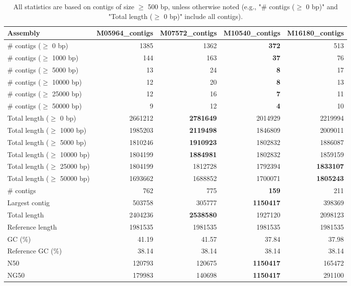 \documentclass[12pt,a4paper]{article}
\begin{document}
\begin{table}[ht]
\begin{center}
\caption{All statistics are based on contigs of size $\geq$ 500 bp, unless otherwise noted (e.g., "\# contigs ($\geq$ 0 bp)" and "Total length ($\geq$ 0 bp)" include all contigs).}
\begin{tabular}{|l*{4}{|r}|}
\hline
Assembly & M05964\_contigs & M07572\_contigs & M10540\_contigs & M16180\_contigs \\ \hline
\# contigs ($\geq$ 0 bp) & 1385 & 1362 & {\bf 372} & 513 \\ \hline
\# contigs ($\geq$ 1000 bp) & 144 & 163 & {\bf 37} & 76 \\ \hline
\# contigs ($\geq$ 5000 bp) & 13 & 24 & {\bf 8} & 17 \\ \hline
\# contigs ($\geq$ 10000 bp) & 12 & 20 & {\bf 8} & 13 \\ \hline
\# contigs ($\geq$ 25000 bp) & 12 & 16 & {\bf 7} & 11 \\ \hline
\# contigs ($\geq$ 50000 bp) & 9 & 12 & {\bf 4} & 10 \\ \hline
Total length ($\geq$ 0 bp) & 2661212 & {\bf 2781649} & 2014929 & 2219994 \\ \hline
Total length ($\geq$ 1000 bp) & 1985203 & {\bf 2119498} & 1846809 & 2009011 \\ \hline
Total length ($\geq$ 5000 bp) & 1810246 & {\bf 1910923} & 1802832 & 1886087 \\ \hline
Total length ($\geq$ 10000 bp) & 1804199 & {\bf 1884981} & 1802832 & 1859159 \\ \hline
Total length ($\geq$ 25000 bp) & 1804199 & 1812728 & 1792394 & {\bf 1833107} \\ \hline
Total length ($\geq$ 50000 bp) & 1693662 & 1688852 & 1700071 & {\bf 1805243} \\ \hline
\# contigs & 762 & 775 & {\bf 159} & 211 \\ \hline
Largest contig & 503758 & 305777 & {\bf 1150417} & 398369 \\ \hline
Total length & 2404236 & {\bf 2538580} & 1927120 & 2098123 \\ \hline
Reference length & 1981535 & 1981535 & 1981535 & 1981535 \\ \hline
GC (\%) & 41.19 & 41.57 & 37.84 & 37.98 \\ \hline
Reference GC (\%) & 38.14 & 38.14 & 38.14 & 38.14 \\ \hline
N50 & 120793 & 120675 & {\bf 1150417} & 165472 \\ \hline
NG50 & 179983 & 140698 & {\bf 1150417} & 291100 \\ \hline

\end{tabular}
\end{center}
\end{table}
\end{document}
